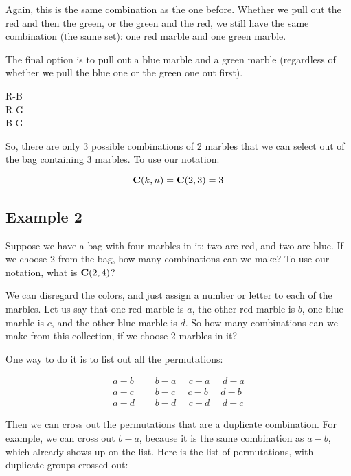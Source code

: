 \documentclass[../../../main.tex]{subfiles}
\begin{document}
\noindent
Again, this is the same combination as the one before. Whether we pull out the red and then the green, or the green and the red, we still have the same combination (the same set): one red marble and one green marble.

The final option is to pull out a blue marble and a green marble (regardless of whether we pull the blue one or the green one out first). 
 
\begin{center}
  R-B \\
  R-G \\
  B-G
\end{center}

\noindent
So, there are only 3 possible combinations of 2 marbles that we can select out of the bag containing 3 marbles. To use our notation:

\begin{equation*}
  \mathbf{C}(k, n) = \mathbf{C}(2, 3) = 3
\end{equation*}


\subsection{Example 2}

Suppose we have a bag with four marbles in it: two are red, and two are blue. If we choose 2 from the bag, how many combinations can we make? To use our notation, what is $\mathbf{C}(2, 4)$?

We can disregard the colors, and just assign a number or letter to each of the marbles. Let us say that one red marble is $a$, the other red marble is $b$, one blue marble is $c$, and the other blue marble is $d$. So how many combinations can we make from this collection, if we choose 2 marbles in it?

One way to do it is to list out all the permutations:

\begin{align*}
  a-b ~~~~~~ &b-a ~~~~~~ c-a ~~~~~~ d-a \\
  a-c ~~~~~~ &b-c ~~~~~~ c-b ~~~~~~ d-b \\
  a-d ~~~~~~ &b-d ~~~~~~ c-d ~~~~~~ d-c 
\end{align*}

\noindent
Then we can cross out the permutations that are a duplicate combination. For example, we can cross out $b-a$, because it is the same combination as $a - b$, which already shows up on the list. Here is the list of permutations, with duplicate groups crossed out:
\end{document}
